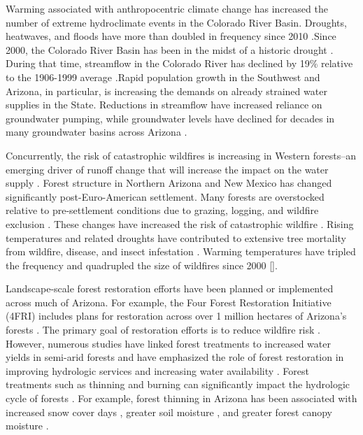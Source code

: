 \documentclass[
  number]{elsarticle}
\begin{document}
Warming associated with anthropocentric climate change has increased the
number of extreme hydroclimate events in the Colorado River Basin.
Droughts, heatwaves, and floods have more than doubled in frequency
since 2010 \citep{bennett_concurrent_2021}.Since 2000, the Colorado
River Basin has been in the midst of a historic drought
\citep{meko_treering_2022, williams_rapid_2022}. During that time,
streamflow in the Colorado River has declined by 19\% relative to the
1906-1999 average
\citep{hogan_recent_2024, udall_twentyfirst_2017}.Rapid population
growth in the Southwest and Arizona, in particular, is increasing the
demands on already strained water supplies in the State. Reductions in
streamflow have increased reliance on groundwater pumping, while
groundwater levels have declined for decades in many groundwater basins
across Arizona \citep{tadych_historical_2024}.

Concurrently, the risk of catastrophic wildfires is increasing in
Western forests--an emerging driver of runoff change that will increase
the impact on the water supply \citep{williams_rapid_2022}. Forest
structure in Northern Arizona and New Mexico has changed significantly
post-Euro-American settlement. Many forests are overstocked relative to
pre-settlement conditions due to grazing, logging, and wildfire
exclusion \citep{covington_southwestern_1994, friederici2013}. These
changes have increased the risk of catastrophic wildfire
\citep{allen_ecological_2002}. Rising temperatures and related droughts
have contributed to extensive tree mortality from wildfire, disease, and
insect infestation \citep{berner_tree_2017}. Warming temperatures have
tripled the frequency and quadrupled the size of wildfires since 2000
{[}\citep{iglesias2022}{]}.

Landscape-scale forest restoration efforts have been planned or
implemented across much of Arizona. For example, the Four Forest
Restoration Initiative (4FRI) includes plans for restoration across over
1 million hectares of Arizona's forests
\citep{schultz_collaborative_2012}. The primary goal of restoration
efforts is to reduce wildfire risk
\citep{allen_ecological_2002, friederici2013}. However, numerous studies
have linked forest treatments to increased water yields in semi-arid
forests and have emphasized the role of forest restoration in improving
hydrologic services and increasing water availability
\citep{bosch_review_1982, baker_effects_1986, gottfried_moderate_1991, smerdon_overview_2009, zou_streamflow_2010, wyatt_estimating_2013, moreno_modeling_2015, simonit_impact_2015, wyatt_semiarid_2015, odonnell_forest_2018, schenk_impacts_2020, hibbert1979}.
Forest treatments such as thinning and burning can significantly impact
the hydrologic cycle of forests \citep{del_campo_global_2022}. For
example, forest thinning in Arizona has been associated with increased
snow cover days
\citep{sankey_multi-scale_2015, belmonte_uav-based_2021, donager_integrating_2021},
greater soil moisture \citep{belmonte_soil_2022, sankey_thinning_2022},
and greater forest canopy moisture \citep{sankey_regionalscale_2021}.
\end{document}
